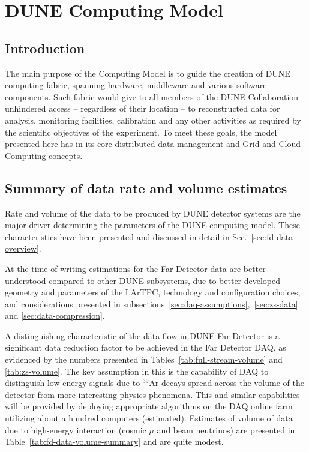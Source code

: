 \section{DUNE Computing Model}
\label{sec:computing_model}

\subsection{Introduction}
The main purpose of the Computing Model is to guide the creation of DUNE computing fabric, spanning
hardware, middleware and various software components. Such fabric would give to all members of the DUNE
Collaboration unhindered access -- regardless of their location -- to reconstructed data for analysis, monitoring facilities,
calibration and any other activities as required by the scientific objectives of the experiment. To meet these goals,
the model presented here has in its core distributed data management and Grid and Cloud Computing concepts.

\subsection{Summary of data rate and volume estimates}
Rate and volume of the data to be produced by DUNE detector systems are the major driver determining the parameters
of the DUNE computing model. These characteristics  have been presented and discussed in detail in Sec.~\ref{sec:fd-data-overview}.

At the time of writing estimations for the Far Detector data are better understood compared to other DUNE subsystems,
due to better developed geometry and parameters of the LArTPC, technology and configuration choices, and considerations
presented in subsections~\ref{sec:daq-assumptions},~\ref{sec:zs-data} and \ref{sec:data-compression}.

A distinguishing characteristic of the data flow in DUNE Far Detector is a significant data reduction factor to be achieved
in the Far Detector DAQ, as evidenced by the numbers presented in Tables~\ref{tab:full-stream-volume} and \ref{tab:zs-volume}.
The key assumption in this is the capability of DAQ to distinguish low energy signals  due to $^{39}$Ar decays spread
across the volume of the detector from more interesting physics phenomena. This and similar capabilities will be provided
by deploying appropriate algorithms on the DAQ online farm utilizing about a hundred computers (estimated).
Estimates of volume of data due to high-energy interaction (cosmic $\mu$ and beam neutrinos) are presented in
Table~\ref{tab:fd-data-volume-summary} and are quite modest.

